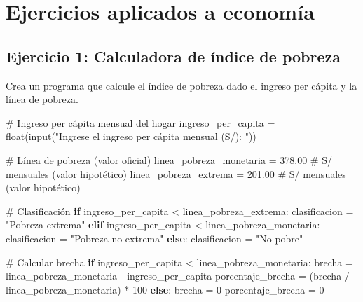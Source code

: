 \documentclass[
  doc,
  floatsintext,
  longtable,
  a4paper,
  nolmodern,
  notxfonts,
  notimes,
  12pt,
  colorlinks=true,linkcolor=blue,citecolor=blue,urlcolor=blue]{apa7}
\newenvironment{Shaded}{\begin{snugshade}}{\end{snugshade}}
\newcommand{\BuiltInTok}[1]{\textcolor[rgb]{0.00,0.23,0.31}{#1}}
\newcommand{\CommentTok}[1]{\textcolor[rgb]{0.37,0.37,0.37}{#1}}
\newcommand{\ControlFlowTok}[1]{\textcolor[rgb]{0.00,0.23,0.31}{\textbf{#1}}}
\newcommand{\DecValTok}[1]{\textcolor[rgb]{0.68,0.00,0.00}{#1}}
\newcommand{\FloatTok}[1]{\textcolor[rgb]{0.68,0.00,0.00}{#1}}
\newcommand{\NormalTok}[1]{\textcolor[rgb]{0.00,0.23,0.31}{#1}}
\newcommand{\OperatorTok}[1]{\textcolor[rgb]{0.37,0.37,0.37}{#1}}
\newcommand{\StringTok}[1]{\textcolor[rgb]{0.13,0.47,0.30}{#1}}
\begin{document}
\section{Ejercicios aplicados a
economía}\label{ejercicios-aplicados-a-economuxeda}

\subsection{Ejercicio 1: Calculadora de índice de
pobreza}\label{ejercicio-1-calculadora-de-uxedndice-de-pobreza}

Crea un programa que calcule el índice de pobreza dado el ingreso per
cápita y la línea de pobreza.

\begin{Shaded}
\begin{Highlighting}[]
\CommentTok{\# Ingreso per cápita mensual del hogar}
\NormalTok{ingreso\_per\_capita }\OperatorTok{=} \BuiltInTok{float}\NormalTok{(}\BuiltInTok{input}\NormalTok{(}\StringTok{"Ingrese el ingreso per cápita mensual (S/): "}\NormalTok{))}

\CommentTok{\# Línea de pobreza (valor oficial)}
\NormalTok{linea\_pobreza\_monetaria }\OperatorTok{=} \FloatTok{378.00}  \CommentTok{\# S/ mensuales (valor hipotético)}
\NormalTok{linea\_pobreza\_extrema }\OperatorTok{=} \FloatTok{201.00}  \CommentTok{\# S/ mensuales (valor hipotético)}

\CommentTok{\# Clasificación}
\ControlFlowTok{if}\NormalTok{ ingreso\_per\_capita }\OperatorTok{\textless{}}\NormalTok{ linea\_pobreza\_extrema:}
\NormalTok{    clasificacion }\OperatorTok{=} \StringTok{"Pobreza extrema"}
\ControlFlowTok{elif}\NormalTok{ ingreso\_per\_capita }\OperatorTok{\textless{}}\NormalTok{ linea\_pobreza\_monetaria:}
\NormalTok{    clasificacion }\OperatorTok{=} \StringTok{"Pobreza no extrema"}
\ControlFlowTok{else}\NormalTok{:}
\NormalTok{    clasificacion }\OperatorTok{=} \StringTok{"No pobre"}

\CommentTok{\# Calcular brecha}
\ControlFlowTok{if}\NormalTok{ ingreso\_per\_capita }\OperatorTok{\textless{}}\NormalTok{ linea\_pobreza\_monetaria:}
\NormalTok{    brecha }\OperatorTok{=}\NormalTok{ linea\_pobreza\_monetaria }\OperatorTok{{-}}\NormalTok{ ingreso\_per\_capita}
\NormalTok{    porcentaje\_brecha }\OperatorTok{=}\NormalTok{ (brecha }\OperatorTok{/}\NormalTok{ linea\_pobreza\_monetaria) }\OperatorTok{*} \DecValTok{100}
\ControlFlowTok{else}\NormalTok{:}
\NormalTok{    brecha }\OperatorTok{=} \DecValTok{0}
\NormalTok{    porcentaje\_brecha }\OperatorTok{=} \DecValTok{0}


\end{Highlighting}
\end{Shaded}
\end{document}
